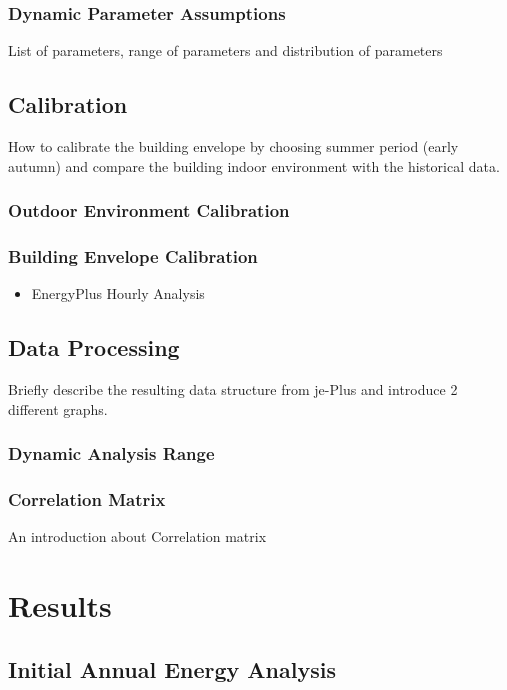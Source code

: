 \documentclass[11pt, a4paper]{article}
\theoremstyle{definition}
\begin{document}
		\subsubsection{Dynamic Parameter Assumptions}
		List of parameters, range of parameters and distribution of parameters


	\subsection{Calibration}
		How to calibrate the building envelope by choosing summer period (early autumn) and compare the building indoor environment with the historical data.

		\subsubsection{Outdoor Environment Calibration}
		\subsubsection{Building Envelope Calibration}
		\begin{itemize}
			\item EnergyPlus Hourly Analysis
		\end{itemize}


	
	\subsection{Data Processing}
		Briefly describe the resulting data structure from je-Plus and introduce 2 different graphs.
		\subsubsection{Dynamic Analysis Range}

		\subsubsection{Correlation Matrix}
		An introduction about Correlation matrix

\section{Results}

	\subsection{Initial Annual Energy Analysis}
		
\end{document}
